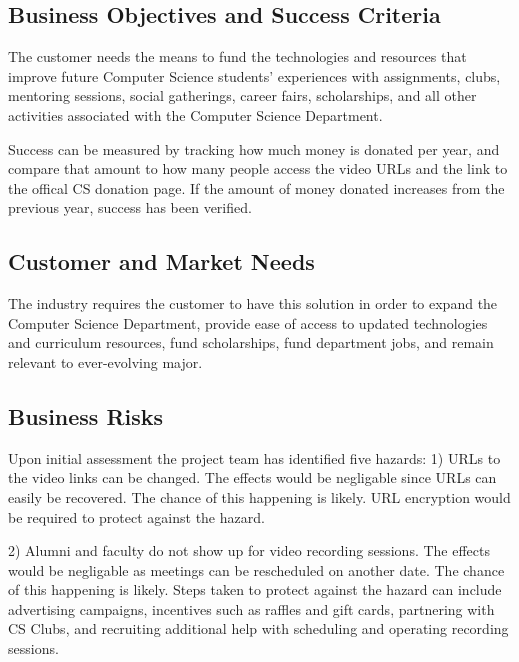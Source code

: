 \subsection{Business Objectives and Success Criteria}

The customer needs the means to fund the technologies and resources that improve future Computer Science 
students' experiences with assignments, clubs, mentoring sessions, social gatherings, career fairs, 
scholarships, and all other activities associated with the Computer Science Department.

Success can be measured by tracking how much money is donated per year, and compare that amount to how many people
access the video URLs and the link to the offical CS donation page. If the amount of money donated increases from the
previous year, success has been verified.

\subsection{Customer and Market Needs}

The industry requires the customer to have this solution in order to expand the Computer Science 
Department, provide ease of access to updated technologies and curriculum resources, fund scholarships, 
fund department jobs, and remain relevant to ever-evolving major.

\subsection{Business Risks}

Upon initial assessment the project team has identified five hazards:
1) URLs to the video links can be changed. The effects would be negligable since URLs can easily be recovered. 
The chance of this happening is likely.
URL encryption would be required to protect against the hazard.

2) Alumni and faculty do not show up for video recording sessions. 
The effects would be negligable as meetings can be rescheduled on another date. 
The chance of this happening is likely. Steps taken to protect against the hazard can include advertising campaigns, 
incentives such as raffles and gift cards, partnering with CS Clubs, and recruiting additional help with scheduling 
and operating recording sessions.

